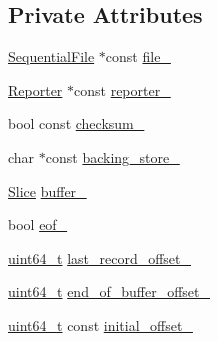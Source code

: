 \subsection*{Private Attributes}
\begin{DoxyCompactItemize}
\item 
\hyperlink{classleveldb_1_1_sequential_file}{Sequential\+File} $\ast$const \hyperlink{classleveldb_1_1log_1_1_reader_a6e58e3ad57c4c1e3bae658c6bfd0dbe9}{file\+\_\+}
\item 
\hyperlink{classleveldb_1_1log_1_1_reader_1_1_reporter}{Reporter} $\ast$const \hyperlink{classleveldb_1_1log_1_1_reader_a1b678a3e93092d4c43a37e2042e7117f}{reporter\+\_\+}
\item 
bool const \hyperlink{classleveldb_1_1log_1_1_reader_a7eaa2d26bc056381d9abd8e08db352f3}{checksum\+\_\+}
\item 
char $\ast$const \hyperlink{classleveldb_1_1log_1_1_reader_ad02774743fb83dbc70d440b7f8e7e4da}{backing\+\_\+store\+\_\+}
\item 
\hyperlink{classleveldb_1_1_slice}{Slice} \hyperlink{classleveldb_1_1log_1_1_reader_a1d0eee5ed5354ccd3d35fd56b2daafb6}{buffer\+\_\+}
\item 
bool \hyperlink{classleveldb_1_1log_1_1_reader_a9bfab430cb87a2358e03600ed8dc1e73}{eof\+\_\+}
\item 
\hyperlink{stdint_8h_aaa5d1cd013383c889537491c3cfd9aad}{uint64\+\_\+t} \hyperlink{classleveldb_1_1log_1_1_reader_adf95d56ac65b7d75b2aed71040f5cde6}{last\+\_\+record\+\_\+offset\+\_\+}
\item 
\hyperlink{stdint_8h_aaa5d1cd013383c889537491c3cfd9aad}{uint64\+\_\+t} \hyperlink{classleveldb_1_1log_1_1_reader_a18cc9904e3b660e100b392722c6c67fb}{end\+\_\+of\+\_\+buffer\+\_\+offset\+\_\+}
\item 
\hyperlink{stdint_8h_aaa5d1cd013383c889537491c3cfd9aad}{uint64\+\_\+t} const \hyperlink{classleveldb_1_1log_1_1_reader_a2de3030899a0d2803e983f7e567c5ca5}{initial\+\_\+offset\+\_\+}
\end{DoxyCompactItemize}


